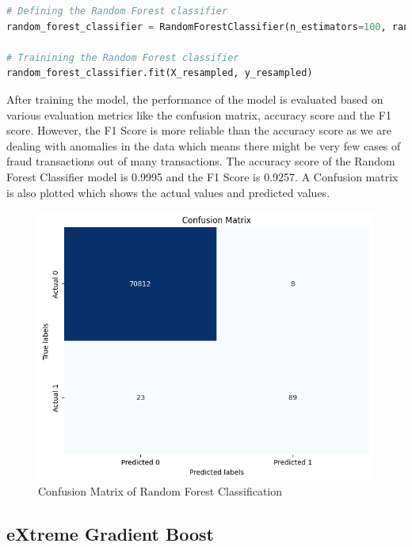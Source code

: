 \begin{lstlisting}[language=Python, caption={Training the model using Random Forest Classification}, label=list:python_code_ex]
# Defining the Random Forest classifier
random_forest_classifier = RandomForestClassifier(n_estimators=100, random_state=42)

# Trainining the Random Forest classifier
random_forest_classifier.fit(X_resampled, y_resampled)
\end{lstlisting}

 After training the model, the performance of the model is evaluated based on various evaluation metrics like the confusion matrix, accuracy score and the F1 score. However, the F1 Score is more reliable than the accuracy score as we are dealing with anomalies in the data which means there might be very few cases of fraud transactions out of many transactions. The accuracy score of the Random Forest Classifier model is 0.9995 and the F1 Score is 0.9257. A Confusion matrix is also plotted which shows the actual values and predicted values.

\clearpage

 \begin{figure}[ht]
    \centering
    \includegraphics[scale=0.7]{figures/CM_RandomForest.png}
    \caption{Confusion Matrix of Random Forest Classification}
    \label{fig:Plot of the Data}
\end{figure}



 \subsection{eXtreme Gradient Boost }

